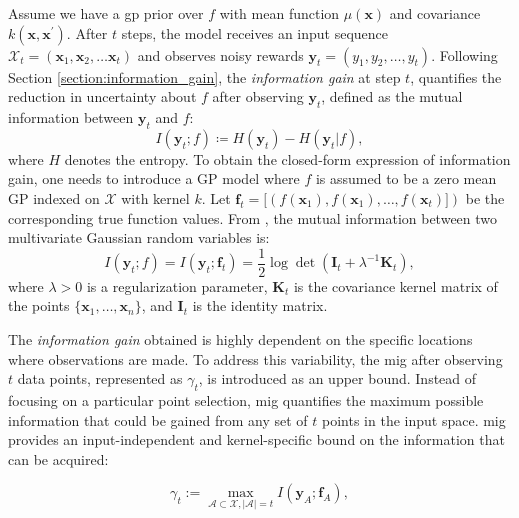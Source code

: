 Assume we have a \ac{gp} prior over \( f \) with mean function \( \mu(\mathbf{x}) \) and covariance \( k(\mathbf{x}, \mathbf{x}^\prime) \). After $t$ steps, the model receives an input sequence $\mathcal{X}_t = (\mathbf{x}_1, \mathbf{x}_2, \dots  \mathbf{x}_t)$ and observes noisy rewards $\mathbf{y}_t = (y_1, y_2, \dots, y_t)$. Following Section \ref{section:information_gain}, the \emph{information gain} at step $t$, quantifies the reduction in uncertainty about $f$ after observing $\mathbf{y}_t$, defined as the mutual information between  $\mathbf{y}_t$ and $f$:
\[
I(\mathbf{y}_t; f) \coloneqq  H(\mathbf{y}_t) - H(\mathbf{y}_t \rvert f), 
\]
where $H$ denotes the entropy. To obtain the closed-form expression of information gain, one needs to introduce a GP model where $f$ is assumed to be a zero mean GP indexed on $\mathcal X$ with kernel $k$. Let $\mathbf{f}_t = [\left(f(\mathbf{x}_1), f(\mathbf{x}_1), \dots, f(\mathbf{x}_t)] \right)$ be the corresponding true function values.  From \citet{cover1999elements}, the mutual information between two multivariate Gaussian random variables is: 
\[ I(\mathbf{y}_t; f) = I(\mathbf{y}_t; \mathbf{f}_t) = \frac{1}{2} \log \det (\mathbf{I}_t + \lambda^{-1}\mathbf{K}_t), \]
where $\lambda > 0$ is a regularization parameter, $\mathbf{K}_t$ is the covariance kernel matrix of the points \( \{\mathbf{x}_1, \dots, \mathbf{x}_n\} \),
and \( \mathbf{I}_t \) is the identity matrix.


The \textit{information gain} obtained is highly dependent on the specific locations where observations are made. To address this variability, the \acf{mig} after observing $t$ data points, represented as $\gamma_t$, is introduced as an upper bound. Instead of focusing on a particular point selection, \ac{mig} quantifies the maximum possible information that could be gained from any set of $t$ points in the input space. \ac{mig} provides an input-independent and kernel-specific bound on the information that can be acquired:

\[ \gamma_t := \max_{\mathcal{A} \subset \mathcal{X}, \lvert \mathcal{A} \rvert = t} I(\mathbf{y}_A; \mathbf{f}_A),\]

